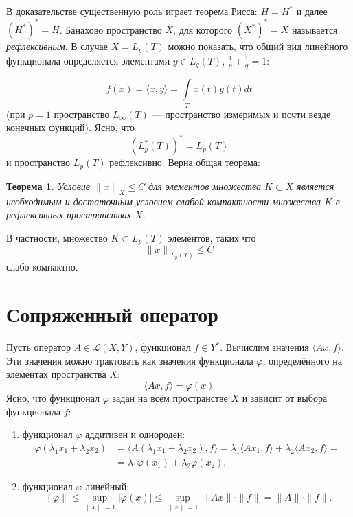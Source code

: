 \documentclass[12pt,a4paper,titlepage,oneside]{book}
\theoremstyle{definition}
\theoremstyle{plain}
\newtheorem*{theorem}{Теорема}
\theoremstyle{break}
\theoremstyle{remark}
\theoremstyle{remark}
\theoremstyle{remark}
\theoremstyle{remark}
\theoremstyle{plain}
\theoremstyle{plain}
\begin{document}
В доказательстве существенную роль играет теорема Рисса: $H=H^*$ и далее $(H^*)^*=H$. Банахово пространство $X$, для которого $(X^*)^*=X$ называется \textit{рефлексивным}. В случае $X=L_p(T)$ можно показать, что общий вид линейного функционала определяется элементами $y \in L_q(T)$, 
$\frac{1}{p}+ \frac{1}{q}=1$:

\begin{equation*}
f(x)= \langle x,y \rangle =\displaystyle\int\limits_T x(t)y(t)dt
\end{equation*}
(при $p=1$ пространство $L_\infty(T)$ --- пространство измеримых и почти везде конечных функций).
Ясно, что 
\begin{equation*}
{(L_p^*(T))}^*=L_p(T)
\end{equation*}
и пространство $L_p(T)$ рефлексивно. Верна общая теорема:
\begin{theorem}
Условие ${\lVert x \lVert}_X \leqslant C$ для элементов множества $K \subset X$ является необходимым и достаточным условием слабой компактности множества $K$ в рефлексивных пространствах $X$.
\end{theorem}
В частности, множество $K \subset L_p(T)$ элементов, таких что 
\begin{equation*}
{\lVert x \lVert}_{L_p(T)} \leqslant C
\end{equation*}
слабо компактно.

\section{Сопряженный оператор}
Пусть оператор $A \in \mathcal{L}(X,Y)$, функционал $f \in Y^*$. Вычислим значения $ \langle Ax,f \rangle $. Эти значения можно трактовать как значения функционала $\varphi$, определённого на элементах пространства $X$:
\begin{equation}
 \langle Ax,f \rangle =\varphi(x)
\end{equation}
Ясно, что функционал $\varphi$ задан на всём пространстве $X$ и зависит от выбора функционала $f$:
\begin{enumerate}
\item функционал $\varphi$ аддитивен и однороден:
\begin{align*}
\varphi(\lambda_1x_1+\lambda_2x_2) &= 
 \langle A(\lambda_1x_1+\lambda_2x_2),f \rangle =
\lambda_1 \langle Ax_1,f \rangle  + \lambda_2 \langle Ax_2,f \rangle  =\\
&= \lambda_1\varphi(x_1) + \lambda_2\varphi(x_2),
\end{align*}
\item функционал $\varphi$ линейный:
$$\lVert \varphi \lVert \leqslant \underset{\lVert x\lVert =1}{\sup} 
\vert \varphi(x) \vert \leqslant  \underset{\lVert x\lVert =1}{\sup} 
\lVert Ax \lVert \cdot \lVert f \lVert =
 \lVert A \lVert \cdot \lVert f \lVert.$$
\end{enumerate}
\end{document}
